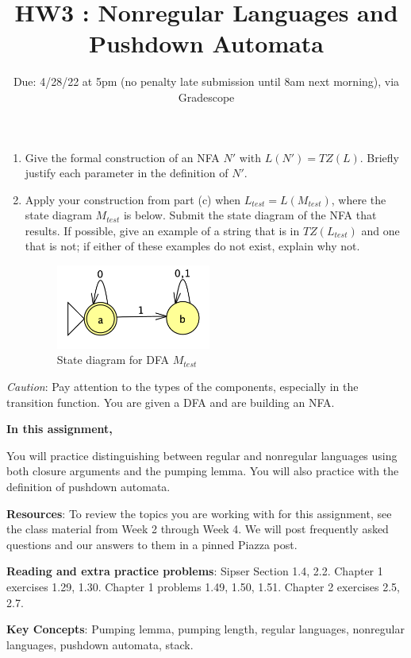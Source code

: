 \begin{enumerate}
\begin{enumerate}
\item Give the formal construction of an NFA $N'$ with $L(N') = TZ(L)$.  Briefly justify 
each parameter in the definition of  $N'$. 
\item Apply your construction from part (c)  when $L_{test} = L(M_{test})$, where the 
state diagram $M_{test}$ is below.  Submit the state diagram of the NFA that results.
If possible, give an example of a string that is in $TZ(L_{test})$ and one that is not; if either of these examples
do not exist, explain why not.
\begin{figure}[h]
   \centering
   \includegraphics[width=2in]{../../resources/machines/MtestDFA.png}
   \caption{State diagram for DFA $M_{test}$}
\end{figure}
\end{enumerate}
{\it Caution}: Pay attention to the types of the components, especially
in the transition function.  You are given a DFA and are building an NFA.
\end{enumerate}
\newpage

\title{HW3 : Nonregular Languages and Pushdown Automata}
\date{Due: 4/28/22 at 5pm (no penalty late submission until 8am next morning), via Gradescope}


\maketitle
\thispagestyle{fancy}

{\bf In this assignment,}

You will practice distinguishing between regular and nonregular languages using both closure
arguments and the pumping lemma. You will also practice with the definition of pushdown automata.

{\bf Resources}: To review the topics you are working with 
for this assignment, see the class material from  Week 2 through Week 4.
We will post frequently asked questions and our answers to them in a 
pinned Piazza post.

{\bf Reading and extra practice problems}: Sipser Section 1.4, 2.2.
Chapter 1 exercises 1.29, 1.30. Chapter 1 problems 1.49, 1.50, 1.51. Chapter 2 exercises 2.5, 2.7.

{\bf Key Concepts}: Pumping lemma, pumping length, regular languages, 
nonregular languages, pushdown automata, stack.

